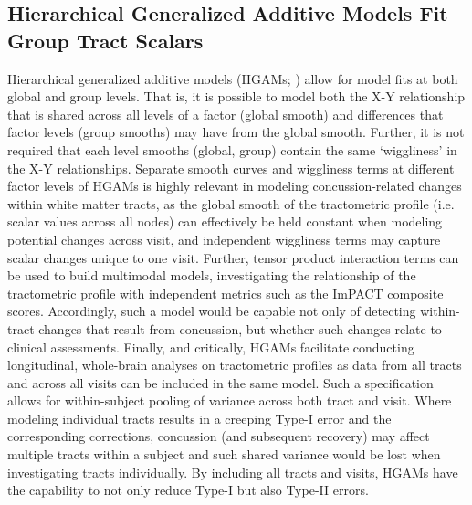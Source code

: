 \documentclass[12pt]{article}
\begin{document}
\subsection{Hierarchical Generalized Additive Models Fit Group Tract Scalars}
\label{ssec:meth-gam}
Hierarchical generalized additive models (HGAMs; \cite{pedersen2019HierarchicalGeneralizedAdditive}) allow for model fits at both global and group levels. That is, it is possible to model both the X-Y relationship that is shared across all levels of a factor (global smooth) and differences that factor levels (group smooths) may have from the global smooth. Further, it is not required that each level smooths (global, group) contain the same `wiggliness' in the X-Y relationships. Separate smooth curves and wiggliness terms at different factor levels of HGAMs is highly relevant in modeling concussion-related changes within white matter tracts, as the global smooth of the tractometric profile (i.e. scalar values across all nodes) can effectively be held constant when modeling potential changes across visit, and independent wiggliness terms may capture scalar changes unique to one visit. Further, tensor product interaction terms can be used to build multimodal models, investigating the relationship of the tractometric profile with independent metrics such as the ImPACT composite scores. Accordingly, such a model would be capable not only of detecting within-tract changes that result from concussion, but whether such changes relate to clinical assessments. Finally, and critically, HGAMs facilitate conducting longitudinal, whole-brain analyses on tractometric profiles as data from all tracts and across all visits can be included in the same model. Such a specification allows for within-subject pooling of variance across both tract and visit. Where modeling individual tracts results in a creeping Type-I error and the corresponding corrections, concussion (and subsequent recovery) may affect multiple tracts within a subject and such shared variance would be lost when investigating tracts individually. By including all tracts and visits, HGAMs have the capability to not only reduce Type-I but also Type-II errors.
\end{document}
